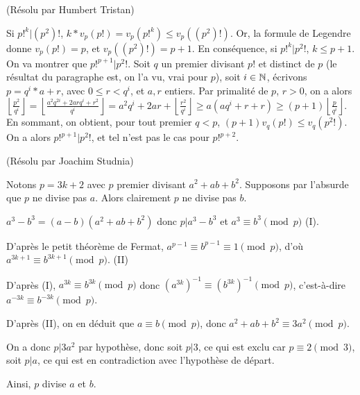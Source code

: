 \begin{sol}[64](R\'esolu par Humbert Tristan)

		Si $p!^k | (p^2)!$, $k*v_p(p!) = v_p(p!^k) \leq v_p((p^2)!)$. 
		Or, la formule de Legendre donne $v_p(p!)=p$, et $v_p((p^2)!)=p+1$. En cons\'equence, si $p!^k | p^2!$, $k \leq p+1$. \\
		On va montrer que $p!^{p+1} | p^2!$. Soit $q$ un premier divisant $p!$ et distinct de $p$ (le r\'esultat du paragraphe est, on l'a vu, vrai pour $p$), soit $i \in \mathbb{N}$, \'ecrivons $p=q^i*a+r$, avec $0 \leq r < q^i$, et $a,r$ entiers. Par primalit\'e de $p$, $r > 0$, on a alors \\ $\left\lfloor \frac{p^2}{q^i}\right\rfloor = \left\lfloor \frac{a^2q^{2i}+2arq^i+r^2}{q^i}\right\rfloor=a^2q^i+2ar+\left\lfloor \frac{r^2}{q^i}\right\rfloor \geq a(aq^i+r+r) \geq (p+1) \left\lfloor \frac{p}{q^i}\right\rfloor$. En sommant, on obtient, pour tout premier $q < p$, $(p+1)v_q(p!) \leq v_q(p^2!)$. \\
		On a alors $p!^{p+1} | p^2!$, et tel n'est pas le cas pour $p!^{p+2}$. 
\end{sol}

\begin{sol}[126](Résolu par Joachim Studnia)

Notons $p=3k+2$ avec $p$ premier divisant $a^2+ab+b^2$. Supposons par l'absurde que $p$ ne divise pas $a$. Alors clairement $p$ ne divise pas $b$.

$a^3-b^3 = (a-b)(a^2+ab+b^2)$ donc $p | a^3-b^3$ et $a^3 \equiv b^3 \pmod p$ (I).

D'après le petit théorème de Fermat, \mbox{$a^{p-1} \equiv b^{p-1} \equiv 1 \pmod p$}, d'où \mbox{$a^{3k+1} \equiv b^{3k+1} \pmod p$}. (II)

D'après (I), $a^{3k} \equiv b^{3k} \pmod p$ donc $(a^{3k})^{-1} \equiv (b^{3k})^{-1} \pmod p$, c'est-à-dire $a^{-3k} \equiv b^{-3k} \pmod p$.

D'après (II), on en déduit que $a \equiv b \pmod p$, donc \mbox{$a^2+ab+b^2 \equiv 3a^2 \pmod p$}.

On a donc $p | 3a^2$ par hypothèse, donc soit $p | 3$, ce qui est exclu car \mbox{$p \equiv 2 \pmod 3$}, soit $p |a$, ce qui est en contradiction avec l'hypothèse de départ.

Ainsi, $p$ divise $a$ et $b$.

\end{sol}

